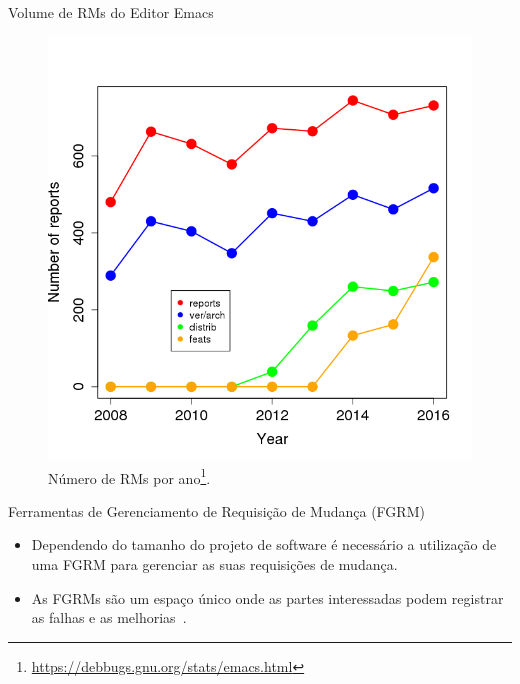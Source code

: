 \documentclass[t,14pt,mathserif]{beamer}
\begin{document}
\begin{frame}{Volume de RMs do Editor Emacs}
    \begin{figure}[htpb]
        \centering
        \includegraphics[width=.45\linewidth]{../img/sample.png}
\caption{Número de RMs por ano\footnote{\url{https://debbugs.gnu.org/stats/emacs.html}}.}
\label{fig:emacs_num_rm_por_ano}
    \end{figure}
\end{frame}

\begin{frame}{Ferramentas de Gerenciamento de Requisição de Mudança (FGRM)}
	\begin{itemize}
        \item Dependendo do tamanho do projeto de software é necessário a
              utilização de uma \alert{FGRM} para gerenciar as suas requisições de
              mudança.
        \item As \alert{FGRMs} são um espaço único onde as partes interessadas
              podem registrar as falhas e as melhorias~\cite{1407819}.
	\end{itemize}
\end{frame}
\end{document}
